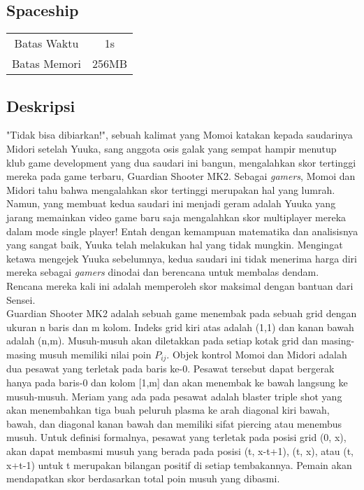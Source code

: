 \documentclass{article}
\begin{document}
\begin{center}

    
    \section*{Spaceship} %

    \begin{tabular}{ | c c | }
        \hline
        Batas Waktu  & 1s \\    %
        Batas Memori & 256MB \\  %
        \hline
    \end{tabular}
\end{center}

\subsection*{Deskripsi}

"Tidak bisa dibiarkan!", sebuah kalimat yang Momoi katakan kepada saudarinya Midori setelah Yuuka, sang anggota osis galak yang sempat hampir menutup klub game development yang dua saudari ini bangun, mengalahkan skor tertinggi mereka pada game terbaru, Guardian Shooter MK2. Sebagai \textit{gamers}, Momoi dan Midori tahu bahwa mengalahkan skor tertinggi merupakan hal yang lumrah. Namun, yang membuat kedua saudari ini menjadi geram adalah Yuuka yang jarang memainkan video game baru saja mengalahkan skor multiplayer mereka dalam mode single player! Entah dengan kemampuan matematika dan analisisnya yang sangat baik, Yuuka telah melakukan hal yang tidak mungkin. Mengingat ketawa mengejek Yuuka sebelumnya, kedua saudari ini tidak menerima harga diri mereka sebagai \textit{gamers} dinodai dan berencana untuk membalas dendam. Rencana mereka kali ini adalah memperoleh skor maksimal dengan bantuan dari Sensei.\\

Guardian Shooter MK2 adalah sebuah game menembak pada sebuah grid dengan ukuran n baris dan m kolom. Indeks grid kiri atas adalah (1,1) dan kanan bawah adalah (n,m). Musuh-musuh akan diletakkan pada setiap kotak grid dan masing-masing musuh memiliki nilai poin $P_{ij}$. Objek kontrol Momoi dan Midori adalah dua pesawat yang terletak pada baris ke-0. Pesawat tersebut dapat bergerak hanya pada baris-0 dan kolom [1,m] dan akan menembak ke bawah langsung ke musuh-musuh. Meriam yang ada pada pesawat adalah blaster triple shot yang akan menembahkan tiga buah peluruh plasma ke arah diagonal kiri bawah, bawah, dan diagonal kanan bawah dan memiliki sifat piercing atau menembus musuh. Untuk definisi formalnya, pesawat yang terletak pada posisi grid (0, x), akan dapat membasmi musuh yang berada pada posisi (t, x-t+1), (t, x), atau (t, x+t-1) untuk t merupakan bilangan positif di setiap tembakannya. Pemain akan mendapatkan skor berdasarkan total poin musuh yang dibasmi.\\
\end{document}
